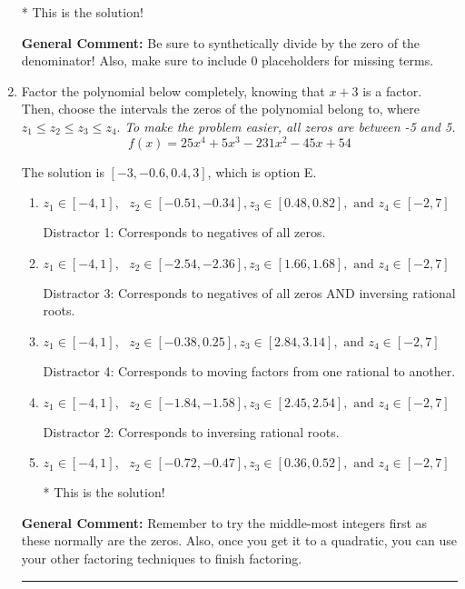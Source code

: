 \documentclass{extbook}[14pt]
\newcommand{\litem}[1]{\item #1

\rule{\textwidth}{0.4pt}}
\begin{document}
\begin{enumerate}
{\begin{enumerate}[label=\Alph*.]
* This is the solution!
\end{enumerate}

\textbf{General Comment:} Be sure to synthetically divide by the zero of the denominator! Also, make sure to include 0 placeholders for missing terms.
}
\litem{
Factor the polynomial below completely, knowing that $x+3$ is a factor. Then, choose the intervals the zeros of the polynomial belong to, where $z_1 \leq z_2 \leq z_3 \leq z_4$. \textit{To make the problem easier, all zeros are between -5 and 5.}
\[ f(x) = 25x^{4} +5 x^{3} -231 x^{2} -45 x + 54 \]

The solution is \( [-3, -0.6, 0.4, 3] \), which is option E.\begin{enumerate}[label=\Alph*.]
\item \( z_1 \in [-4, 1], \text{   }  z_2 \in [-0.51, -0.34], z_3 \in [0.48, 0.82], \text{   and   } z_4 \in [-2, 7] \)

 Distractor 1: Corresponds to negatives of all zeros.
\item \( z_1 \in [-4, 1], \text{   }  z_2 \in [-2.54, -2.36], z_3 \in [1.66, 1.68], \text{   and   } z_4 \in [-2, 7] \)

 Distractor 3: Corresponds to negatives of all zeros AND inversing rational roots.
\item \( z_1 \in [-4, 1], \text{   }  z_2 \in [-0.38, 0.25], z_3 \in [2.84, 3.14], \text{   and   } z_4 \in [-2, 7] \)

 Distractor 4: Corresponds to moving factors from one rational to another.
\item \( z_1 \in [-4, 1], \text{   }  z_2 \in [-1.84, -1.58], z_3 \in [2.45, 2.54], \text{   and   } z_4 \in [-2, 7] \)

 Distractor 2: Corresponds to inversing rational roots.
\item \( z_1 \in [-4, 1], \text{   }  z_2 \in [-0.72, -0.47], z_3 \in [0.36, 0.52], \text{   and   } z_4 \in [-2, 7] \)

* This is the solution!
\end{enumerate}

\textbf{General Comment:} Remember to try the middle-most integers first as these normally are the zeros. Also, once you get it to a quadratic, you can use your other factoring techniques to finish factoring.
}
\end{enumerate}
\end{document}
